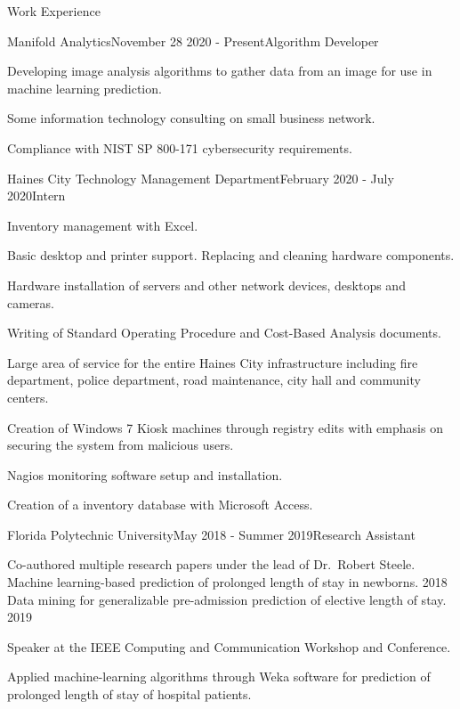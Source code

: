 \documentclass{resume} %
\begin{document}
\begin{rSection}{Work Experience}

\begin{rSubsection}{Manifold Analytics}{November 28 2020 - Present}{Algorithm Developer}{}
	\item Developing image analysis algorithms to gather data from an image for use in machine learning prediction.
	\item Some information technology consulting on small business network.
	\item Compliance with NIST SP 800-171 cybersecurity requirements.
\end{rSubsection}

\begin{rSubsection}{Haines City Technology Management Department}{February 2020 - July 2020}{Intern}{}
	\item Inventory management with Excel. 
	\item Basic desktop and printer support. Replacing and cleaning hardware components.
	\item Hardware installation of servers and other network devices, desktops and cameras.
	\item Writing of Standard Operating Procedure and Cost-Based Analysis documents.
	\item Large area of service for the entire Haines City infrastructure including fire department, police department, road maintenance, city hall and community centers.
	\item Creation of Windows 7 Kiosk machines through registry edits with emphasis on securing the system from malicious users.
	\item Nagios monitoring software setup and installation.
	\item Creation of a inventory database with Microsoft Access.
\end{rSubsection}

\begin{rSubsection}{Florida Polytechnic University}{May 2018 - Summer 2019}{Research Assistant}{}
	\item Co-authored multiple research papers under the lead of Dr.\ Robert Steele.\\
	Machine learning-based prediction of prolonged length of stay in newborns. 2018\\
	Data mining for generalizable pre-admission prediction of elective length of stay. 2019
	\item Speaker at the IEEE Computing and Communication Workshop and Conference.
	\item Applied machine-learning algorithms through Weka software for prediction of prolonged length of stay of hospital patients.
\end{rSubsection}

\end{rSection}
\end{document}
